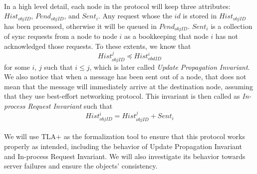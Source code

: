\paragraph*{}
In a high level detail, each node in the protocol will keep three attributes: $Hist_{objID}$, $Pend_{objID}$, and $Sent_i$. Any request whose the $id$ is stored in $Hist_{objID}$ has been processed, otherwise it will be queued in $Pend_{objID}$. $Sent_i$ is a collection of sync requests from a node to node $i$ as a bookkeeping that node $i$ has not acknowledged those requests. To these extents, we know that
$$Hist_{objID}^j \preceq Hist_{obdID}^i$$ for some $i$, $j$ such that $i \leq j$, which is later called \textit{Update Propagation Invariant}. We also notice that when a message has been sent out of a node, that does not mean that the message will immediately arrive at the destination node, assuming that they use best-effort networking protocol. This invariant is then called as \textit{In-process Request Invariant} such that
$$Hist_{objID}^i = Hist_{objID}^j + Sent_i$$

\paragraph{}
We will use TLA+ as the formalization tool to ensure that this protocol works properly as intended, including the behavior of Update Propagation Invariant and In-process Request Invariant. We will also investigate its behavior towards server failures and ensure the objects' consistency. 


